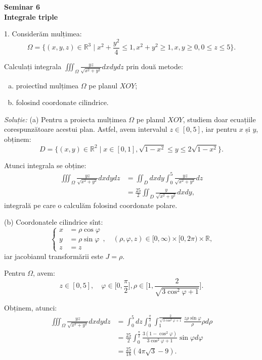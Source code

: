 \documentclass[11pt,a4paper]{article}
\newcommand\ds{\displaystyle}
\newcommand\RR{\mathbb{R}}
\theoremstyle{dotless}
\theoremstyle{dotlessdr}
\begin{document}
\begin{center}
  {\large\textbf{Seminar 6 \\ Integrale triple}}
\end{center}

\vspace{1cm}

1. Considerăm mulțimea:
\[
  \Omega = \{ (x, y, z) \in \RR^3 \mid x^2 + \frac{y^2}{4} \leq 1, x^2 + y^2 \geq 1, x,y \geq 0, 0 \leq z \leq 5 \}.
\]

Calculați integrala $ \ds\iiint_\Omega \frac{yz}{\sqrt{x^2 + y^2}} dxdydz $ prin două metode:
\begin{enumerate}[(a)]
\item proiectînd mulțimea $ \Omega $ pe planul $ XOY $;
\item folosind coordonate cilindrice.
\end{enumerate}

\emph{Soluție:} (a) Pentru a proiecta mulțimea $ \Omega $ pe planul $ XOY $, studiem doar
ecuațiile corespunzătoare acestui plan. Astfel, avem intervalul $ z \in [0, 5] $, iar pentru
$ x $ și $ y $, obținem:
\[
  D = \{(x, y) \in \RR^2 \mid x \in [0, 1], \sqrt{1 - x^2} \leq y \leq 2 \sqrt{1 - x^2} \}.
\]

Atunci integrala se obține:
\begin{align*}
  \iiint_\Omega \frac{yz}{\sqrt{x^2 + y^2}} dxdydz &= \iint_D dxdy \int_0^5 \frac{yz}{\sqrt{x^2 + y^2}} dz \\
                                                   &= \frac{25}{2} \iint_D \frac{y}{\sqrt{x^2 + y^2}} dxdy,
\end{align*}
integrală pe care o calculăm folosind coordonate polare.

(b) Coordonatele cilindrice sînt:
\[
  \begin{cases}
    x &= \rho \cos \varphi \\
    y &= \rho \sin \varphi \\
    z & = z
  \end{cases}, \quad (\rho, \varphi, z) \in [0, \infty) \times [0, 2\pi) \times \RR,
\]
iar jacobianul transformării este $ J = \rho $.

Pentru $ \Omega $, avem:
\[
  z \in [0, 5], \quad \varphi \in \big[ 0, \frac{\pi}{2} \big], %
  \rho \in \big[ 1, \frac{2}{\sqrt{3 \cos^2 \varphi + 1}} \big].
\]

Obținem, atunci:
\begin{align*}
  \iiint_\Omega \frac{yz}{\sqrt{x^2 + y^2}} dxdydz &= \int_0^5 dz \int_0^{\frac{\pi}{2}} \int_1^{\frac{2}{\sqrt{3\cos^2 \varphi + 1}}} %
                                                     \frac{z \rho \sin \varphi}{\rho} \rho d\rho \\
                                                   &= \frac{25}{2} \int_0^{\frac{\pi}{2}} \frac{3(1 - \cos^2 \varphi)}{3 \cos^2 \varphi + 1} \sin \varphi d\varphi \\
                                                   &= \frac{25}{18} (4 \pi \sqrt{3} - 9).
\end{align*}
\end{document}
